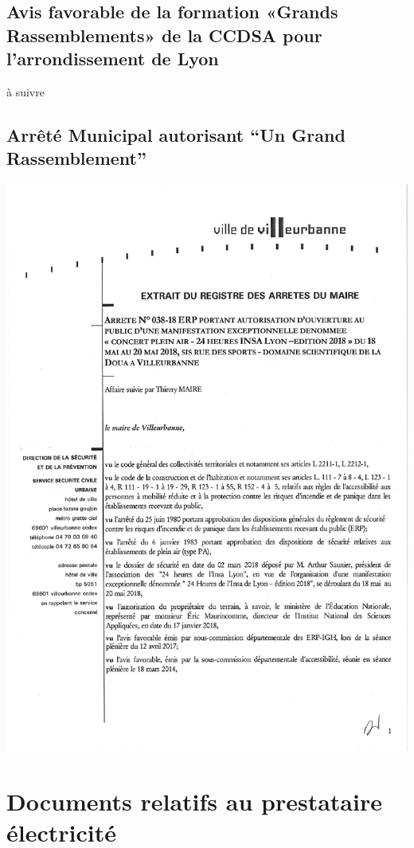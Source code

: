 \documentclass[hidelinks, paper=a4, fontsize=13pt]{report}
\begin{document}
\subsection{Avis favorable de la formation «Grands Rassemblements» de la CCDSA pour l’arrondissement de Lyon}
à suivre

\subsection{Arrêté Municipal autorisant “Un Grand Rassemblement”}
\begin{center}
\includegraphics[scale=0.70]{Annexes/Documents/Villeurbanneconcert}
\end{center}

\section{Documents relatifs au prestataire électricité}
\end{document}
